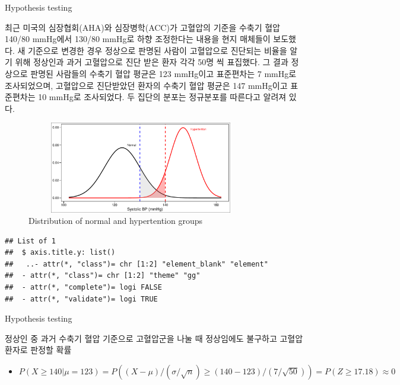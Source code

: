 \documentclass[9pt,ignorenonframetext,xcolor=dvipsnames]{beamer}
\providecommand{\tightlist}{%
  \setlength{\itemsep}{0pt}\setlength{\parskip}{0pt}}
\newlength{\wideitemsep}
\let\olditem\item
\renewcommand{\item}{\setlength{\itemsep}{\wideitemsep}\olditem}
\begin{document}
\begin{frame}[fragile]{Hypothesis testing}

\begin{tcolorbox}[colback=gray!10,colframe=black, title=\textbf{Example: blood pressure cutpoint}]
  \scriptsize  최근 미국의 심장협회(AHA)와 심장병학(ACC)가 고혈압의 기준을 수축기 혈압 140/80 mmHg에서 130/80 mmHg로 하향 조정한다는 내용을 현지 매체들이 보도했다. 새 기준으로 변경한 경우 정상으로 판명된 사람이 고혈압으로 진단되는 비율을 알기 위해 정상인과 과거 고혈압으로 진단 받은 환자 각각 50명 씩 표집했다. 그 결과 정상으로 판명된 사람들의 수축기 혈압 평균은 123 mmHg이고 표준편차는 7 mmHg로 조사되었으며, 고혈압으로 진단받았던 환자의 수축기 혈압 평균은 147 mmHg이고 표준편차는 10 mmHg로 조사되었다. 두 집단의 분포는 정규분포를 따른다고 알려져 있다. 
\end{tcolorbox}

\begin{figure}[H]

{\centering \includegraphics[width=10cm,height=4cm]{Figures/dist-2-1} 

}

\caption{Distribution of normal and hypertention groups}\label{fig:dist-2}
\end{figure}

\begin{verbatim}
## List of 1
##  $ axis.title.y: list()
##   ..- attr(*, "class")= chr [1:2] "element_blank" "element"
##  - attr(*, "class")= chr [1:2] "theme" "gg"
##  - attr(*, "complete")= logi FALSE
##  - attr(*, "validate")= logi TRUE
\end{verbatim}

\end{frame}

\begin{frame}{Hypothesis testing}

정상인 중 과거 수축기 혈압 기준으로 고혈압군을 나눌 때 정상임에도
불구하고 고혈압 환자로 판정할 확률

\begin{itemize}
\tightlist
\item
  \(P(X \geq 140 | \mu = 123) = P((X - \mu)/(\sigma/\sqrt{n}) \geq (140-123)/(7/\sqrt{50})) = P(Z \geq 17.18) \approx 0\)
\end{itemize}

\end{frame}
\end{document}
